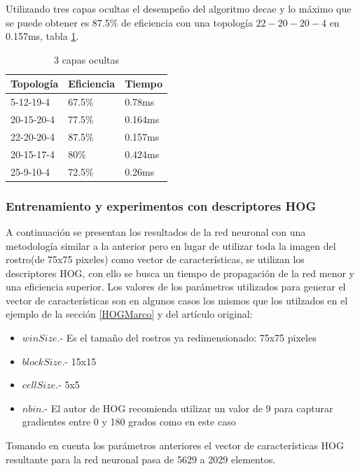 Utilizando tres capas ocultas el desempeño del algoritmo decae y lo máximo que se puede obtener es 87.5\% de eficiencia con una topología $22-20-20-4$ en 0.157ms, tabla \ref{tab:tresCapa4}.
\begin{table}[]
	\centering
	\caption{3 capas ocultas}
	\label{my-label}
	\begin{tabular}{|l|l|l|}
		\hline
		Topología  & Eficiencia & Tiempo  \\ \hline
		5-12-19-4  & 67.5\%     & 0.78ms  \\ \hline
		20-15-20-4 & 77.5\%     & 0.164ms \\ \hline
		22-20-20-4 & 87.5\%     & 0.157ms \\ \hline
		20-15-17-4 & 80\%       & 0.424ms \\ \hline
		25-9-10-4  & 72.5\%     & 0.26ms  \\ \hline
	\end{tabular} \label{tab:tresCapa4}
\end{table}

\subsubsection{Entrenamiento y experimentos con descriptores HOG}
A continuación se presentan los resultados de la red neuronal con una metodología similar a la anterior pero en lugar de utilizar toda la imagen del rostro(de 75x75 pixeles) como vector de características, se utilizan los descriptores HOG, con ello se busca un tiempo de propagación de la red menor y una eficiencia superior. 
Los valores de los parámetros utilizados para generar el vector de características son en algunos casos los mismos que los utilzados en el ejemplo de la sección \ref{HOGMarco} y del artículo original:
\begin{itemize}
	\item $winSize$.- Es el tamaño del rostros ya redimensionado: 75x75 pixeles
	\item $blockSize$.- 15x15
	\item $cellSize$.- 5x5
	\item $nbin$.- El autor de HOG recomienda utilizar un valor de 9 para capturar gradientes entre 0 y 180 grados como en este caso
\end{itemize}
 Tomando en cuenta los parámetros anteriores el vector de características HOG resultante para la red neuronal pasa de 5629 a 2029 elementos.

